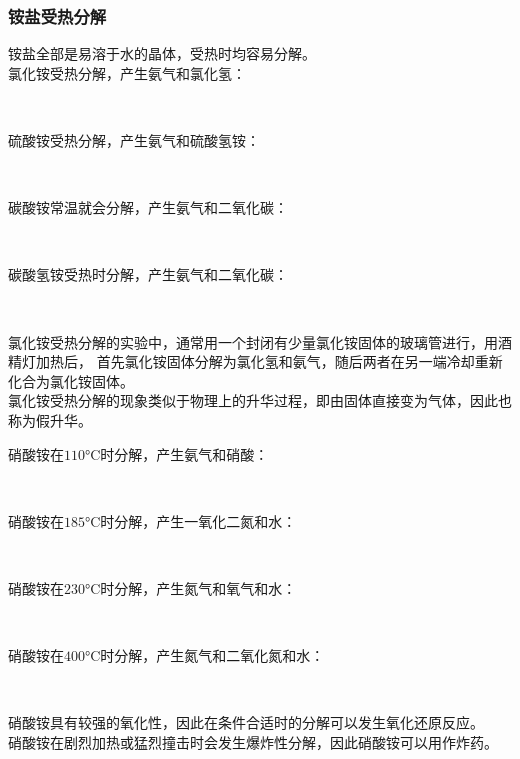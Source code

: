 \documentclass[UTF8]{ctexart}
\begin{document}
\subsubsection{铵盐受热分解}
    铵盐全部是易溶于水的晶体，受热时均容易分解。\\[3mm]
    氯化铵受热分解，产生氨气和氯化氢：
    \begin{center}
        \\[4mm]
    \end{center}
    硫酸铵受热分解，产生氨气和硫酸氢铵：
    \begin{center}
        \\[4mm]
    \end{center}
    碳酸铵常温就会分解，产生氨气和二氧化碳：
    \begin{center}
        \\[4mm]
    \end{center}
    碳酸氢铵受热时分解，产生氨气和二氧化碳：
    \begin{center}
        \\[4mm]
    \end{center}
    氯化铵受热分解的实验中，通常用一个封闭有少量氯化铵固体的玻璃管进行，用酒精灯加热后，
    首先氯化铵固体分解为氯化氢和氨气，随后两者在另一端冷却重新化合为氯化铵固体。\\[3mm]
    氯化铵受热分解的现象类似于物理上的升华过程，即由固体直接变为气体，因此也称为假升华。

\newpage

    硝酸铵在$110$\si{\degreeCelsius}时分解，产生氨气和硝酸：
    \begin{center}
        \\[6mm]
    \end{center}
    硝酸铵在$185$\si{\degreeCelsius}时分解，产生一氧化二氮和水：
    \begin{center}
        \\[6mm]
    \end{center}
    硝酸铵在$230$\si{\degreeCelsius}时分解，产生氮气和氧气和水：
    \begin{center}
        \\[6mm]
    \end{center}
    硝酸铵在$400$\si{\degreeCelsius}时分解，产生氮气和二氧化氮和水：
    \begin{center}
        \\[6mm]
    \end{center}
    硝酸铵具有较强的氧化性，因此在条件合适时的分解可以发生氧化还原反应。\\[3mm]
    硝酸铵在剧烈加热或猛烈撞击时会发生爆炸性分解，因此硝酸铵可以用作炸药。
\end{document}
